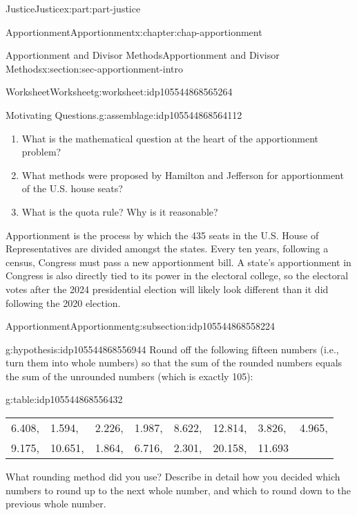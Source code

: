 \documentclass[oneside,10pt,]{book}
\newcommand{\tabularfont}{\relax}
\numberwithin{equation}{section}
\begin{document}
\begin{partptx}{Justice}{}{Justice}{}{}{x:part:part-justice}
\begin{chapterptx}{Apportionment}{}{Apportionment}{}{}{x:chapter:chap-apportionment}
\begin{sectionptx}{Apportionment and Divisor Methods}{}{Apportionment and Divisor Methods}{}{}{x:section:sec-apportionment-intro}
\begin{worksheet-subsection}{Worksheet}{}{Worksheet}{}{}{g:worksheet:idp105544868565264}
\begin{assemblage}{Motivating Questions.}{g:assemblage:idp105544868564112}
\begin{enumerate}[label=(\alph*)]
\item{}What is the mathematical question at the heart of the apportionment problem?%
\item{}What methods were proposed by Hamilton and Jefferson for apportionment of the U.S. house seats?%
\item{}What is the quota rule? Why is it reasonable?%
\end{enumerate}
%
\end{assemblage}
\begin{introduction}{}%
Apportionment is the process by which the 435 seats in the U.S. House of Representatives are divided amongst the states. Every ten  years, following a census, Congress must pass a new apportionment bill.  A state's apportionment in Congress is also directly tied to its power in the electoral college, so the electoral votes after the 2024 presidential election will likely look different than it did following the 2020 election.%
\end{introduction}%
%
%
\typeout{************************************************}
\typeout{************************************************}
%
\begin{subsectionptx}{Apportionment}{}{Apportionment}{}{}{g:subsection:idp105544868558224}
\begin{hypothesis}{}{}{g:hypothesis:idp105544868556944}%
Round off the following fifteen numbers (i.e., turn  them into whole numbers) so that the sum of the rounded numbers equals the sum of the unrounded numbers (which is exactly 105):%
\begin{tableptx}{\textbf{}}{g:table:idp105544868556432}{}%
\centering%
{\tabularfont%
\begin{tabular}{llllllll}
6.408,&1.594,&2.226,&1.987,&8.622,&12.814,&3.826,&4.965,\tabularnewline[0pt]
9.175,&10.651,&1.864,&6.716,&2.301,&20.158,&11.693&
\end{tabular}
}%
\end{tableptx}%
What rounding method did you use? Describe in detail how you decided which numbers to round up to the next whole number, and which to round down to the previous whole number.%
\end{hypothesis}

\end{subsectionptx}
\end{worksheet-subsection}
\end{sectionptx}
\end{chapterptx}
\end{partptx}
\end{document}
